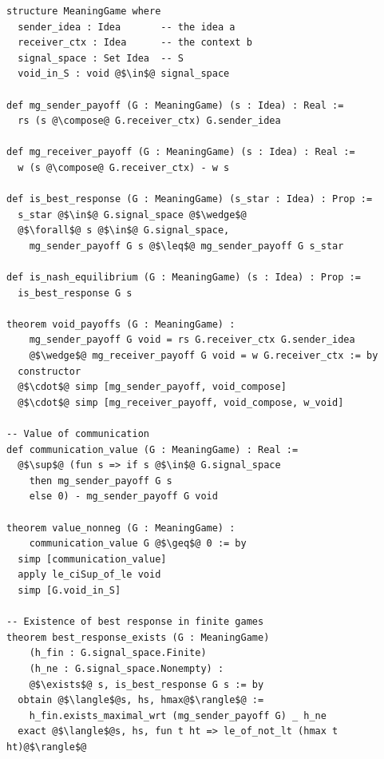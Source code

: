\begin{lstlisting}
structure MeaningGame where
  sender_idea : Idea       -- the idea a
  receiver_ctx : Idea      -- the context b
  signal_space : Set Idea  -- S
  void_in_S : void @$\in$@ signal_space

def mg_sender_payoff (G : MeaningGame) (s : Idea) : Real :=
  rs (s @\compose@ G.receiver_ctx) G.sender_idea

def mg_receiver_payoff (G : MeaningGame) (s : Idea) : Real :=
  w (s @\compose@ G.receiver_ctx) - w s

def is_best_response (G : MeaningGame) (s_star : Idea) : Prop :=
  s_star @$\in$@ G.signal_space @$\wedge$@
  @$\forall$@ s @$\in$@ G.signal_space,
    mg_sender_payoff G s @$\leq$@ mg_sender_payoff G s_star

def is_nash_equilibrium (G : MeaningGame) (s : Idea) : Prop :=
  is_best_response G s

theorem void_payoffs (G : MeaningGame) :
    mg_sender_payoff G void = rs G.receiver_ctx G.sender_idea
    @$\wedge$@ mg_receiver_payoff G void = w G.receiver_ctx := by
  constructor
  @$\cdot$@ simp [mg_sender_payoff, void_compose]
  @$\cdot$@ simp [mg_receiver_payoff, void_compose, w_void]

-- Value of communication
def communication_value (G : MeaningGame) : Real :=
  @$\sup$@ (fun s => if s @$\in$@ G.signal_space
    then mg_sender_payoff G s
    else 0) - mg_sender_payoff G void

theorem value_nonneg (G : MeaningGame) :
    communication_value G @$\geq$@ 0 := by
  simp [communication_value]
  apply le_ciSup_of_le void
  simp [G.void_in_S]

-- Existence of best response in finite games
theorem best_response_exists (G : MeaningGame)
    (h_fin : G.signal_space.Finite)
    (h_ne : G.signal_space.Nonempty) :
    @$\exists$@ s, is_best_response G s := by
  obtain @$\langle$@s, hs, hmax@$\rangle$@ :=
    h_fin.exists_maximal_wrt (mg_sender_payoff G) _ h_ne
  exact @$\langle$@s, hs, fun t ht => le_of_not_lt (hmax t ht)@$\rangle$@
\end{lstlisting}

